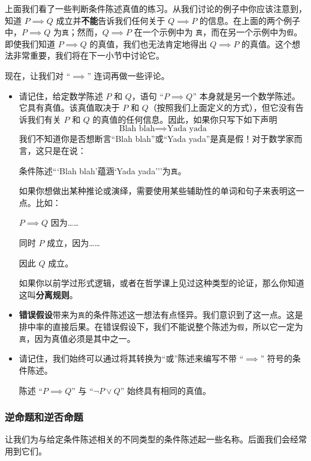 上面我们看了一些判断条件陈述真值的练习。从我们讨论的例子中你应该注意到，知道 $P \implies Q$ 成立并\textbf{不能}告诉我们任何关于 $Q \implies P$ 的信息。在上面的两个例子中，$P\implies Q$ 为\verb|真|；然而，$Q \implies P$ 在一个示例中为 \verb|真|，而在另一个示例中为\verb|假|。即使我们知道 $P \implies Q$ 的真值，我们也无法肯定地得出 $Q \implies P$ 的真值。这个想法非常重要，我们将在下一小节中讨论它。

现在，让我们对 ``$\implies$'' 连词再做一些评论。

\begin{itemize}
    \item 请记住，给定数学陈述 $P$ 和 $Q$，语句 ``$P \implies Q$'' 本身就是另一个数学陈述。它具有真值。该真值取决于 $P$ 和 $Q$（按照我们上面定义的方式），但它没有告诉我们有关 $P$ 和 $Q$ 的真值的任何信息。因此，如果你只写下如下声明
    \[\text{Blah blah} \implies \text{Yada yada}\]
    我们不知道你是否想断言``Blah blah''或``Yada yada''是真是假！对于数学家而言，这只是在说：
    \begin{center}
        条件陈述```Blah blah'蕴涵`Yada yada'''为\verb|真|。
    \end{center}
    如果你想做出某种推论或演绎，需要使用某些辅助性的单词和句子来表明这一点。比如：
    \begin{center}
        $P \implies Q$ 因为……

        同时 $P$ 成立，因为……

        因此 $Q$ 成立。
    \end{center}
    如果你以前学过形式逻辑，或者在哲学课上见过这种类型的论证，那么你知道这叫\textbf{分离规则}。
    \item \textbf{错误假设}带来为\verb|真|的条件陈述这一想法有点怪异。我们意识到了这一点。这是排中率的直接后果。在错误假设下，我们不能说整个陈述为\verb|假|，所以它一定为\verb|真|，因为真值必须是其中之一。
    \item 请记住，我们始终可以通过将其转换为``或''陈述来编写不带 ``$\implies$'' 符号的条件陈述。
        \begin{center}
            陈述 ``$P \implies Q$'' 与 ``$\neg P \lor Q$'' 始终具有相同的真值。
        \end{center}
\end{itemize}

\subsubsection*{逆命题和逆否命题}

让我们为与给定条件陈述相关的不同类型的条件陈述起一些名称。后面我们会经常用到它们。

